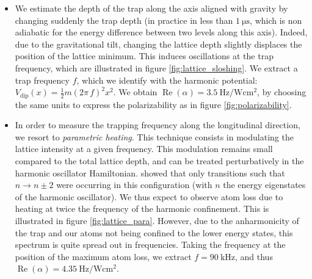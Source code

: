\documentclass[11pt]{article}
\numberwithin{equation}{section}
\numberwithin{figure}{section}
\begin{document}
\begin{itemize}
	\item We estimate the depth of the trap along the axis aligned with gravity by changing suddenly the trap depth (in practice in less than $\SI{1}{\micro\second}$, which is non adiabatic for the energy difference between two levels along this axis). Indeed, due to the gravitational tilt, changing the lattice depth slightly displaces the position of the lattice minimum. This induces oscillations at the trap frequency, which are illustrated in figure \ref{fig:lattice_sloshing}. We extract a trap frequency $f$, which we identify with the harmonic potential: $V_\text{dip} (x) = \frac{1}{2} m (2 \pi \, f)^2 x^2$. We obtain $\operatorname{Re}(\alpha) = \SI{3.5}{\hertz\per\watt\centi\metre\squared}$, by choosing the same units to express the polarizability as in figure \ref{fig:polarizability}.
	\item In order to measure the trapping frequency along the longitudinal direction, we resort to \emph{parametric heating}. This technique consists in modulating the lattice intensity at a given frequency. This modulation remains small compared to the total lattice depth, and can be treated perturbatively in the harmonic oscillator Hamiltonian. \cite{1997_savard} showed that only transitions such that $n \rightarrow n \pm 2$ were occurring in this configuration (with $n$ the energy eigenstates of the harmonic oscillator). We thus expect to observe atom loss due to heating at twice the frequency of the harmonic confinement. This is illustrated in figure \ref{fig:lattice_para}. However, due to the anharmonicity of the trap and our atoms not being confined to the lower energy states, this spectrum is quite spread out in frequencies. Taking the frequency at the position of the maximum atom loss, we extract $f = \SI{90}{\kilo\hertz}$, and thus $\operatorname{Re}(\alpha) = \SI{4.35}{\hertz\per\watt\centi\metre\squared}$.
\end{itemize}
%
\end{document}
